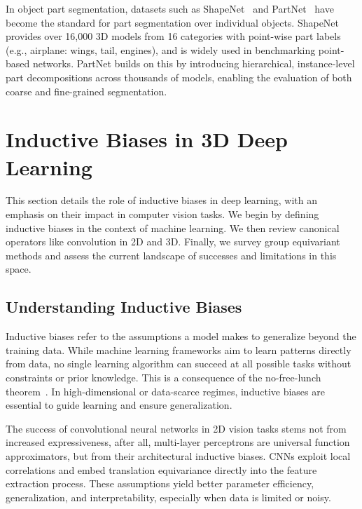 In object part segmentation, datasets such as ShapeNet~\cite{chang2015shapenet}
and PartNet~\cite{mo2019partnet} have become the standard for part segmentation
over individual objects. ShapeNet provides over 16,000 3D models from 16
categories with point-wise part labels (e.g., airplane: wings, tail, engines),
and is widely used in benchmarking point-based networks. PartNet builds on this
by introducing hierarchical, instance-level part decompositions across
thousands of models, enabling the evaluation of both coarse and fine-grained
segmentation.

\section{Inductive Biases in 3D Deep Learning}\label{sec:inductive_biases}

This section details the role of inductive biases in deep learning, with an
emphasis on their impact in computer vision tasks. We begin by defining
inductive biases in the context of machine learning. We then review canonical
operators like convolution in 2D and 3D. Finally, we survey group equivariant
methods and assess the current landscape of successes and limitations in this
space.

\subsection{Understanding Inductive Biases}

Inductive biases refer to the assumptions a model makes to generalize beyond
the training data.
%
While machine learning frameworks aim to learn patterns directly from data, no
single learning algorithm can succeed at all possible tasks without constraints
or prior knowledge.
%
This is a consequence of the no-free-lunch
theorem~\cite{baxter2000model,goyal2022inductive}.
%
In high-dimensional or data-scarce regimes, inductive biases are essential to
guide learning and ensure generalization.

The success of convolutional neural networks in 2D vision tasks stems not from
increased expressiveness, after all, multi-layer perceptrons are universal
function approximators, but from their architectural inductive biases.
%
CNNs exploit local correlations and embed translation equivariance directly
into the feature extraction process. These assumptions yield better parameter
efficiency, generalization, and interpretability, especially when data is
limited or noisy.

